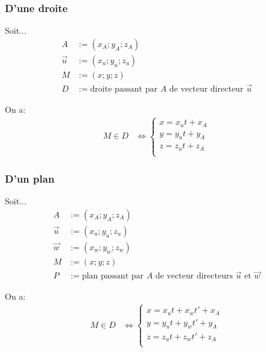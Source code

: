 \documentclass{article}
\begin{document}
\subsubsection{D'une droite}

Soit...
\begin{equation*}
    \begin{split}
        A &:= (x_A; y_A; z_A) \\
        \vec u &:= (x_u; y_u; z_u) \\
        M &:= (x; y; z) \\
        D &:= \text{droite passant par $A$ de vecteur directeur $\vec u$}
    \end{split}
\end{equation*}

On a:
\begin{equation*}
    \begin{split}
        M \in D &\iff
        \begin{cases}
            x = x_ut + x_A \\
            y = y_ut + y_A \\
            z = z_ut + z_A \\
        \end{cases}
    \end{split}
\end{equation*}

\subsubsection{D'un plan}

Soit...
\begin{equation*}
    \begin{split}
        A &:= (x_A; y_A; z_A) \\
        \vec u &:= (x_u; y_u; z_u) \\
        \vec w &:= (x_w; y_w; z_w) \\
        M &:= (x; y; z) \\
        P &:= \text{plan passant par $A$ de vecteur directeurs $\vec u$ et $\vec w$}
    \end{split}
\end{equation*}

On a:
\begin{equation*}
    \begin{split}
        M \in D &\iff
        \begin{cases}
            x = x_ut + x_wt' + x_A \\
            y = y_ut + y_wt' + y_A \\
            z = z_ut + z_wt' + z_A \\
        \end{cases}
    \end{split}
\end{equation*}
\end{document}
